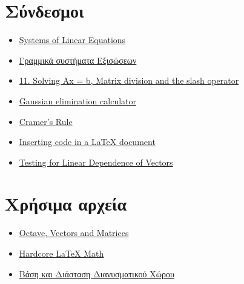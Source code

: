 \documentclass[12pt, fleqn, leqno]{extreport}
\begin{document}
\section{Σύνδεσμοι}
\begin{itemize}
    \item \href{http://sites.science.oregonstate.edu/math/home/programs/undergrad/CalculusQuestStudyGuides/vcalc/system/system.html}{Systems of Linear Equations}
    \item \href{http://esperia.iesl.forth.gr/~kafesaki/Applied-Mathematics/linear-algebra/linear-systems.pdf}{Γραμμικά συστήματα Εξισώσεων}
    \item \href{http://www-h.eng.cam.ac.uk/help/programs/octave/tutorial/}{11. Solving Ax = b, Matrix division and the slash operator}
    \item \href{https://onlinemschool.com/math/assistance/equation/gaus/}{Gaussian elimination calculator}
    \item \href{http://www.matrixlab-examples.com/cramers-rule.html}{Cramer's Rule}
    \item \href{https://pt.overleaf.com/learn/latex/Code_listing}{Inserting code in a LaTeX document}
    \item \href{http://sites.science.oregonstate.edu/math/home/programs/undergrad/CalculusQuestStudyGuides/vcalc/lindep/lindep.html}{Testing for Linear Dependence of Vectors}
\end{itemize}
\section{Χρήσιμα αρχεία}
\begin{itemize}
    \item \href{http://www.yanivplan.com/files/tutorial2vectors.pdf}{Octave, Vectors and Matrices}
    \item \href{http://web.mit.edu/rsi/www/pdfs/advmath.pdf}{Hardcore LaTeX Math}
    \item \href{http://www.katsetis.gr/mathimataeapsimeioseis/plh12/PLI12bash_kai_diastash_dianysmatikoy_xwroy.pdf}{Βάση και Διάσταση Διανυσματικού Χώρου}
\end{itemize}
\end{document}
